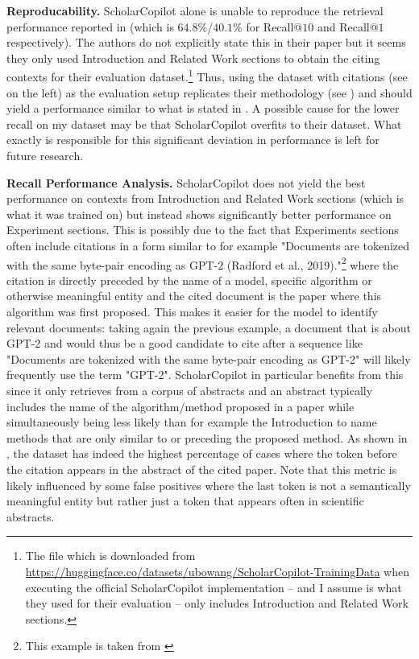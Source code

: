 \textbf{Reproducability.} ScholarCopilot alone is unable to reproduce the retrieval performance reported in \cite{wang2025scholarcopilot} (which is $64.8\%$/$40.1\%$ for Recall@$10$ and Recall@$1$ respectively). The authors do not explicitly state this in their paper but it seems they only used Introduction and Related Work sections to obtain the citing contexts for their evaluation dataset.\footnote{The file  which is downloaded from \url{https://huggingface.co/datasets/ubowang/ScholarCopilot-TrainingData} when executing the official ScholarCopilot implementation -- and I assume is what they used for their evaluation -- only includes Introduction and Related Work sections.} Thus, using the  dataset with  citations (see  on the left) as the evaluation setup replicates their methodology (see \cite[4.2]{wang2025scholarcopilot}) and should yield a performance similar to what is stated in \cite{wang2025scholarcopilot}. A possible cause for the lower recall on my dataset may be that ScholarCopilot overfits to their dataset. What exactly is responsible for this significant deviation in performance is left for future research.

\textbf{Recall Performance Analysis.} ScholarCopilot does not yield the best performance on contexts from Introduction and Related Work sections (which is what it was trained on) but instead shows significantly better performance on Experiment sections. This is possibly due to the fact that Experiments sections often include citations in a form similar to for example "Documents are tokenized with the same byte-pair encoding as GPT-2 (Radford et al., 2019)."\footnote{This example is taken from \cite{lewis2019bart}} where the citation is directly preceded by the name of a model, specific algorithm or otherwise meaningful entity and the cited document is the paper where this algorithm was first proposed. This makes it easier for the model to identify relevant documents: taking again the previous example, a document that is about GPT-2 and would thus be a good candidate to cite after a sequence like "Documents are tokenized with the same byte-pair encoding as GPT-2" will likely frequently use the term "GPT-2". ScholarCopilot in particular benefits from this since it only retrieves from a corpus of abstracts and an abstract typically includes the name of the algorithm/method proposed in a paper while simultaneously being less likely than for example the Introduction to name methods that are only similar to or preceding the proposed method. As shown in , the  dataset has indeed the highest percentage of cases where the token before the citation appears in the abstract of the cited paper. Note that this metric is likely influenced by some false positives where the last token is not a semantically meaningful entity but rather just a token that appears often in scientific abstracts.

